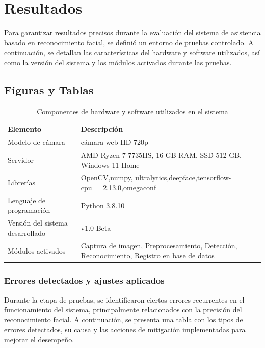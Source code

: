 \fancyhead{}
\fancyfoot{}
\cfoot{\thepage}


\chapter{Resultados}

Para garantizar resultados precisos durante la evaluación del sistema de asistencia basado en reconocimiento facial, se definió un entorno de pruebas controlado. A continuación, se detallan las características del hardware y software utilizados, así como la versión del sistema y los módulos activados durante las pruebas.

\section{Figuras y Tablas}

\begin{table}[H]
    \centering
    \caption{Componentes de hardware y software utilizados en el sistema}
    \label{tab:entorno_pruebas}
    \renewcommand{\arraystretch}{1.3}
    \begin{tabular}{|p{5cm}|p{9cm}|}
        \hline
        \textbf{Elemento} & \textbf{Descripción} \\
        \hline
        Modelo de cámara & cámara web HD 720p \\
        \hline
        Servidor & AMD Ryzen 7 7735HS, 16 GB RAM, SSD 512 GB, Windows 11 Home 	\\
        \hline
        Librerías & OpenCV,numpy, ultralytics,deepface,tensorflow-cpu==2.13.0,omegaconf\\
        \hline
        Lenguaje de programación & Python 3.8.10 \\
        \hline
        Versión del sistema desarrollado & v1.0 Beta \\
        \hline
        Módulos activados & Captura de imagen, Preprocesamiento, Detección, Reconocimiento, Registro en base de datos \\
        \hline
    \end{tabular}
\end{table}


\subsection{Errores detectados y ajustes aplicados}

Durante la etapa de pruebas, se identificaron ciertos errores recurrentes en el funcionamiento del sistema, principalmente relacionados con la precisión del reconocimiento facial. A continuación, se presenta una tabla con los tipos de errores detectados, su causa y las acciones de mitigación implementadas para mejorar el desempeño.

